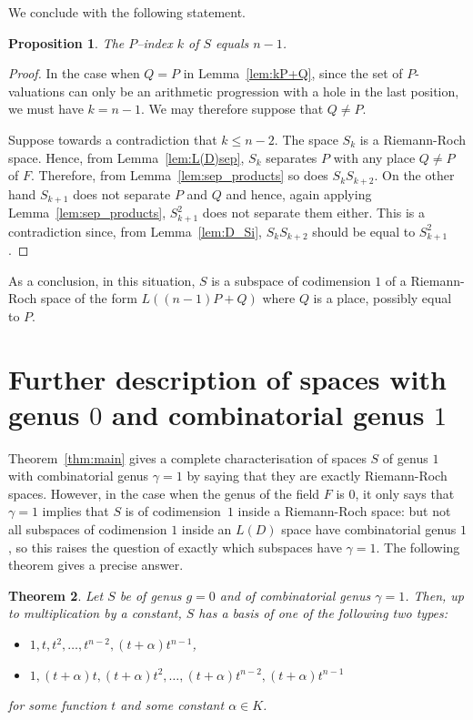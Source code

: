 \documentclass{article}
\theoremstyle{plain}
\newtheorem{thm}{Theorem}[section]
\newtheorem{prop}[thm]{Proposition}
\theoremstyle{definition}
\theoremstyle{remark}
\renewcommand{\leq}{\leqslant}
\begin{document}
We conclude with the following statement.

\begin{prop}
  The $P$--index $k$ of $S$ equals $n-1$.
\end{prop}

\begin{proof}
  In the case when $Q=P$ in Lemma~\ref{lem:kP+Q}, since the set of
  $P$-valuations can only be an arithmetic progression with a hole in
  the last position, we must have $k=n-1$. We may therefore suppose
  that $Q\neq P$. 

  Suppose towards a contradiction that $k \leq n-2$.
  The space $S_k$ is a Riemann-Roch space. Hence,
  from Lemma~\ref{lem:L(D)sep}, $S_k$ separates $P$ with any place
  $Q\neq P$ 
  of $F$. Therefore, from Lemma~\ref{lem:sep_products} %
  so does $S_kS_{k+2}$. On the other hand $S_{k+1}$ does not separate
  $P$ and $Q$ and hence, again applying Lemma~\ref{lem:sep_products}, %
  $S_{k+1}^2$ does not separate them either. 
  This is a contradiction since, from Lemma~\ref{lem:D_Si}, 
  $S_{k}S_{k+2}$ should be equal to $S_{k+1}^2$.
\end{proof}

As a conclusion, in this situation, $S$ is a subspace of 
codimension $1$ of a Riemann-Roch space of the form $L((n-1)P+Q)$
where $Q$ is a place, possibly equal to $P$.

\section{Further description of spaces with genus $0$ and
  combinatorial genus $1$}\label{sec:genus0}

Theorem~\ref{thm:main} gives a complete characterisation of spaces $S$ of
genus $1$ with combinatorial genus $\gamma=1$ by saying that they are
exactly Riemann-Roch spaces. However, in the case when the genus of the
field $F$ is $0$, it only says that $\gamma=1$ implies that $S$ is of
codimension~$1$ inside a Riemann-Roch space: but not all subspaces of
codimension $1$ inside an $L(D)$ space have combinatorial genus $1$,
so this raises the question of exactly which subspaces have
$\gamma=1$. The following theorem gives a precise answer.

\begin{thm}\label{thm:g=0}
  Let $S$ be of genus $g=0$ and of combinatorial genus $\gamma=1$. Then, up to multiplication by a constant, 
$S$ has a basis
of one of the following two types:
\begin{itemize}
\item[(i)]
$1,t,t^2,\ldots ,t^{n-2},(t+\alpha)t^{n-1}$, 
\item[(ii)]
$1,(t+\alpha)t,(t+\alpha)t^2,\ldots , (t+\alpha)t^{n-2}, (t+\alpha)t^{n-1}$
\end{itemize}
for some function $t$ and some constant $\alpha\in K$.
\end{thm}
\end{document}
